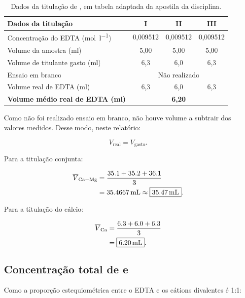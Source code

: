 \documentclass[a4paper,12pt]{article}
\begin{document}
\begin{table}[H]
\centering
\caption{Dados da titulação de , em tabela adaptada da apostila
da disciplina.}
\label{tab:dados_calcio}
\begin{tabular}{lccc}
\toprule
\textbf{Dados da titulação} & \textbf{I} & \textbf{II} & \textbf{III}\\
\midrule
Concentração do EDTA (\si{\mole\per\litre})
  & 0,009512 & 0,009512 & 0,009512\\
Volume da amostra (\si{\milli\litre})
  & 5,00 & 5,00 & 5,00\\
Volume de titulante gasto (\si{\milli\litre})
  & 6,3 & 6,0 & 6,3\\
Ensaio em branco
  & \multicolumn{3}{c}{Não realizado}\\
Volume real de EDTA (\si{\milli\litre})
  & 6,3 & 6,0 & 6,3\\
\textbf{Volume médio real de EDTA (\si{\milli\litre})}
  & \multicolumn{3}{c}{\textbf{6,20}}\\
\bottomrule
\end{tabular}
\end{table}

Como não foi realizado ensaio em branco, não houve volume a subtrair dos
valores medidos. Desse modo, neste relatório:

\begin{equation}
V_{\text{real}}=V_{\text{gasto}}.
\end{equation}

Para a titulação conjunta:

\begin{align}
\overline{V}_{\ce{Ca + Mg}}
&=
\frac{35.1+35.2+36.1}{3}\\
&=
\qty{35.4667}{\milli\litre}
\approx
\boxed{\qty{35.47}{\milli\litre}}.
\end{align}

Para a titulação do cálcio:

\begin{align}
\overline{V}_{\ce{Ca}}
&=
\frac{6.3+6.0+6.3}{3}\\
&=
\boxed{\qty{6.20}{\milli\litre}}.
\end{align}

\subsection{Concentração total de  e }

Como a proporção estequiométrica entre o EDTA e os cátions divalentes é
1:1:
\end{document}
